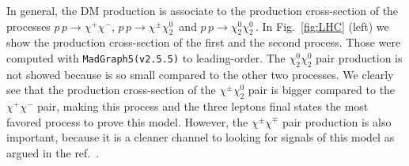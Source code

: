 \documentclass[12pt,letterpaper]{article}
\begin{document}
In general, the DM production is associate to the production cross-section of the processes $p\,p\to\chi^+\chi^-$, $p\,p\to\chi^{\pm}\chi_2^0\,$ and $p\,p\to\chi_2^0\chi_2^0\,$. 
In Fig.~\ref{fig:LHC} (left) we show the production cross-section of the first and the second process.
Those were computed with \texttt{MadGraph5(v2.5.5)}\cite{Alwall:2014hca} to leading-order.
The $\chi_2^0\chi_2^0$ pair production is not showed because is so small compared to the other two processes. 
We clearly see that the production cross-section of the $\chi^{\pm}\chi^0_2$ pair is bigger compared to the $\chi^{+}\chi^{-}$ pair, making this process and the three leptons final states the most favored process to prove this model.
However, the $\chi^{\pm}\chi^{\mp}$ pair production is also important, because it is a cleaner channel to looking for signals of this model as argued in the ref.~\cite{Choubey:2017yyn}.
\end{document}
